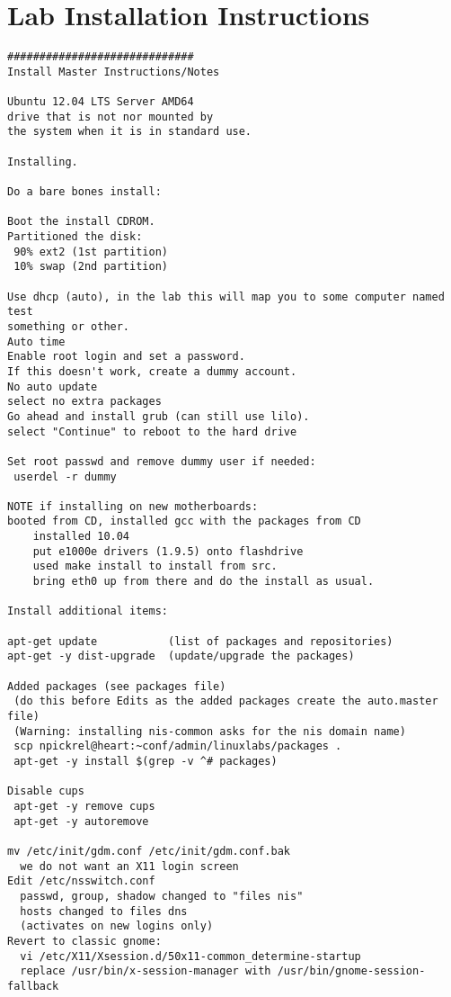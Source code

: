 \chapter{Lab Installation Instructions} \label{ap:lab_installation}

\begin{verbatim}
#############################
Install Master Instructions/Notes

Ubuntu 12.04 LTS Server AMD64
drive that is not nor mounted by
the system when it is in standard use.

Installing.

Do a bare bones install:

Boot the install CDROM.
Partitioned the disk:
 90% ext2 (1st partition)
 10% swap (2nd partition)

Use dhcp (auto), in the lab this will map you to some computer named test
something or other.
Auto time
Enable root login and set a password. 
If this doesn't work, create a dummy account.
No auto update
select no extra packages
Go ahead and install grub (can still use lilo).
select "Continue" to reboot to the hard drive

Set root passwd and remove dummy user if needed:
 userdel -r dummy
   
NOTE if installing on new motherboards:
booted from CD, installed gcc with the packages from CD
    installed 10.04 
    put e1000e drivers (1.9.5) onto flashdrive
    used make install to install from src.
    bring eth0 up from there and do the install as usual.

Install additional items:

apt-get update           (list of packages and repositories)
apt-get -y dist-upgrade  (update/upgrade the packages)

Added packages (see packages file)
 (do this before Edits as the added packages create the auto.master file)
 (Warning: installing nis-common asks for the nis domain name)
 scp npickrel@heart:~conf/admin/linuxlabs/packages .
 apt-get -y install $(grep -v ^# packages)

Disable cups
 apt-get -y remove cups
 apt-get -y autoremove

mv /etc/init/gdm.conf /etc/init/gdm.conf.bak
  we do not want an X11 login screen 
Edit /etc/nsswitch.conf
  passwd, group, shadow changed to "files nis"
  hosts changed to files dns
  (activates on new logins only)
Revert to classic gnome:
  vi /etc/X11/Xsession.d/50x11-common_determine-startup
  replace /usr/bin/x-session-manager with /usr/bin/gnome-session-fallback


\end{verbatim}
